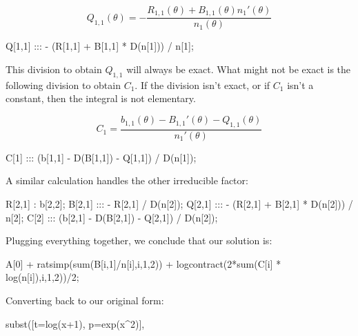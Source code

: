 $$ Q_{1,1}(\theta) = - \frac{R_{1,1}(\theta) + B_{1,1}(\theta) n_1'(\theta)}{n_1(\theta)}$$

\begin{maximacode}
Q[1,1] :::
   - (R[1,1] + B[1,1] * D(n[1])) / n[1];
\end{maximacode}

This division to obtain $Q_{1,1}$ will always be exact.  What might not be exact is the following division
to obtain $C_{1}$.  If the division isn't exact, or if $C_1$ isn't a constant, then the integral is not elementary.

$$ C_1 = \frac{b_{1,1}(\theta) - B_{1,1}'(\theta) - Q_{1,1}(\theta)}{n_1'(\theta)} $$

\begin{maximacode}
C[1] :::
   (b[1,1] - D(B[1,1]) - Q[1,1]) / D(n[1]);
\end{maximacode}

A similar calculation handles the other irreducible factor:

\begin{maximacode}
R[2,1] : b[2,2];
B[2,1] ::: - R[2,1] / D(n[2]);
Q[2,1] :::
   - (R[2,1] + B[2,1] * D(n[2])) / n[2];
C[2] :::
   (b[2,1] - D(B[2,1]) - Q[2,1]) / D(n[2]);
\end{maximacode}

Plugging everything together, we conclude that our solution is:

\begin{maximacode}
A[0] + ratsimp(sum(B[i,1]/n[i],i,1,2))
   + logcontract(2*sum(C[i] * log(n[i]),i,1,2))/2;
\end{maximacode}

\begin{comment}
\begin{multline*}
\int{{x\{(x^2 \psi^2-\theta^2)^2+2x \psi^3(x-(2x^3+2x^2+x+1)\theta)\}}\over{(x+1)(\theta^2 - x^2\psi^2)^2}} dx \\
= x - \theta -\frac{\frac{x}{2}\psi}{\theta + x \psi} - \frac{\frac{x}{2}\psi}{\theta - x \psi} + \frac{1}{2}\ln(\theta + x\psi)- \frac{1}{2}\ln(\theta - x \psi)
\end{multline*}

$$ = x - \theta -\frac{x \psi \theta}{\theta^2 - x^2 \psi^2} + \frac{1}{2}\ln\frac{\theta + x\psi}{\theta - x \psi}$$
\end{comment}

Converting back to our original form:

\begin{maximacode}
subst([t=log(x+1), p=exp(x^2)], %
\end{maximacode}

